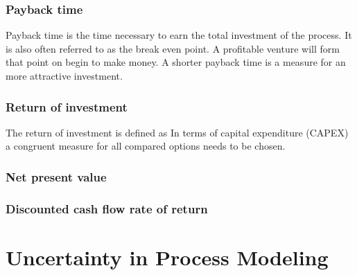 \subsubsection{Payback time}
 Payback time is the time necessary to earn the total investment of the process. It is also often referred to as 
 the break even point. A profitable venture will form that point on begin to make money. A shorter 
 payback time is a measure for an more attractive investment. 

\subsubsection{Return of investment}
The return of investment is defined as 
%
In terms of capital expenditure (CAPEX) a congruent measure for all compared options needs to be chosen. 

\subsubsection{Net present value}

\subsubsection{Discounted cash flow rate of return}

\section{Uncertainty in Process Modeling}
\label{sec:design_uncertainty}






